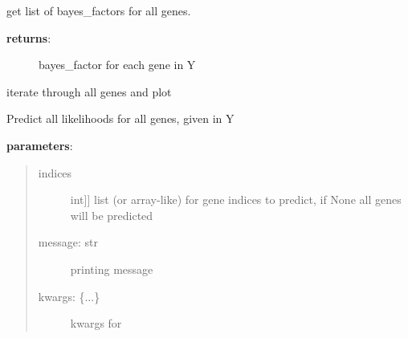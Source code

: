 \documentclass[letterpaper,10pt,english]{sphinxmanual}
\begin{document}
\begin{fulllineitems}
\begin{fulllineitems}
\label{base:gptwosample.twosample.twosample.TwoSample.bayes_factors}
get list of bayes\_factors for all genes.
\begin{description}
\item[{\textbf{returns}:}] \leavevmode
bayes\_factor for each gene in Y

\end{description}

\end{fulllineitems}


\begin{fulllineitems}
\label{base:gptwosample.twosample.twosample.TwoSample.plot}
iterate through all genes and plot

\end{fulllineitems}


\begin{fulllineitems}
\label{base:gptwosample.twosample.twosample.TwoSample.predict_likelihoods}
Predict all likelihoods for all genes, given in Y

\textbf{parameters}:
\begin{quote}
\begin{description}
\item[{indices}] \leavevmode{[}{[}int{]}{]}
list (or array-like) for gene indices to predict, if None all genes will be predicted

\item[{message: str}] \leavevmode
printing message

\item[{kwargs: \{...\}}] \leavevmode
kwargs for 

\end{description}
\end{quote}


\end{fulllineitems}
\end{fulllineitems}
\end{document}

